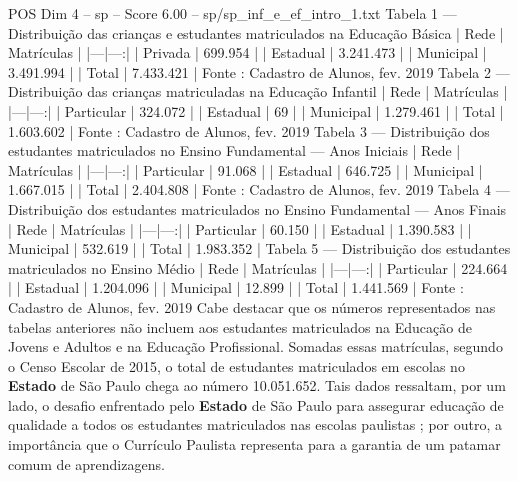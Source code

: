 \begin{textsample}{POS Dim 4 – sp – Score 6.00 – sp/sp\_inf\_e\_ef\_intro\_1.txt}
Tabela 1 — Distribuição das crianças e estudantes matriculados na Educação Básica | Rede | Matrículas | |---|---:| | Privada | 699.954 | | Estadual | 3.241.473 | | Municipal | 3.491.994 | | Total | 7.433.421 | Fonte : Cadastro de Alunos, fev. 2019 Tabela 2 — Distribuição das crianças matriculadas na Educação Infantil | Rede | Matrículas | |---|---:| | Particular | 324.072 | | Estadual | 69 | | Municipal | 1.279.461 | | Total | 1.603.602 | Fonte : Cadastro de Alunos, fev. 2019 Tabela 3 — Distribuição dos estudantes matriculados no Ensino Fundamental — Anos Iniciais | Rede | Matrículas | |---|---:| | Particular | 91.068 | | Estadual | 646.725 | | Municipal | 1.667.015 | | Total | 2.404.808 | Fonte : Cadastro de Alunos, fev. 2019 Tabela 4 — Distribuição dos estudantes matriculados no Ensino Fundamental — Anos Finais | Rede | Matrículas | |---|---:| | Particular | 60.150 | | Estadual | 1.390.583 | | Municipal | 532.619 | | Total | 1.983.352 | Tabela 5 — Distribuição dos estudantes matriculados no Ensino Médio | Rede | Matrículas | |---|---:| | Particular | 224.664 | | Estadual | 1.204.096 | | Municipal | 12.899 | | Total | 1.441.569 | Fonte : Cadastro de Alunos, fev. 2019 Cabe destacar que os números representados nas tabelas anteriores não incluem aos estudantes matriculados na Educação de Jovens e Adultos e na Educação Profissional.
Somadas essas matrículas, segundo o Censo Escolar de 2015, o total de estudantes matriculados em escolas no \textbf{Estado} de São Paulo chega ao número 10.051.652.
Tais dados ressaltam, por um lado, o desafio enfrentado pelo \textbf{Estado} de São Paulo para assegurar educação de qualidade a todos os estudantes matriculados nas escolas paulistas ; por outro, a importância que o Currículo Paulista representa para a garantia de um patamar comum de aprendizagens.

\end{textsample}

